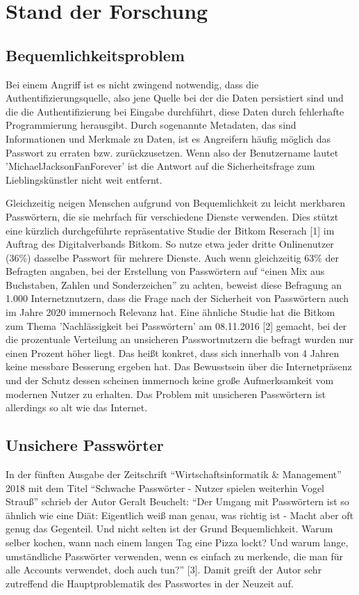 \section{Stand der Forschung}
\subsection{Bequemlichkeitsproblem}
Bei einem Angriff ist es nicht zwingend notwendig, dass die Authentifizierungsquelle, also jene Quelle bei der die Daten persistiert sind und die die Authentifizierung bei Eingabe durchführt, diese Daten durch fehlerhafte Programmierung herausgibt. Durch sogenannte Metadaten, das sind Informationen und Merkmale zu Daten, ist es Angreifern häufig möglich das Passwort zu erraten bzw. zurückzusetzen. Wenn also der Benutzername lautet 'MichaelJacksonFanForever' ist die Antwort auf die Sicherheitsfrage zum Lieblingskünstler nicht weit entfernt.

Gleichzeitig neigen Menschen aufgrund von Bequemlichkeit zu leicht merkbaren Passwörtern, die sie mehrfach für verschiedene Dienste verwenden. Dies stützt eine kürzlich durchgeführte repräsentative Studie der Bitkom Reserach [1] im Auftrag des Digitalverbands Bitkom. So nutze etwa jeder dritte Onlinenutzer (36\%) dasselbe Passwort für mehrere Dienste. Auch wenn gleichzeitig 63\% der Befragten angaben, bei der Erstellung von Passwörtern auf ``einen Mix aus Buchstaben, Zahlen und Sonderzeichen'' zu achten, beweist diese Befragung an 1.000 Internetznutzern, dass die Frage nach der Sicherheit von Passwörtern auch im Jahre 2020 immernoch Relevanz hat. Eine ähnliche Studie hat die Bitkom zum Thema 'Nachlässigkeit bei Passwörtern' am 08.11.2016 [2] gemacht, bei der die prozentuale Verteilung an unsicheren Passwortnutzern die befragt wurden nur einen Prozent höher liegt. Das heißt konkret, dass sich innerhalb von 4 Jahren keine messbare Besserung ergeben hat. Das Bewusstsein über die Internetpräsenz und der Schutz dessen scheinen immernoch keine große Aufmerksamkeit vom modernen Nutzer zu erhalten. Das Problem mit unsicheren Passwörtern ist allerdings so alt wie das Internet.

\subsection{Unsichere Passwörter}
In der fünften Ausgabe der Zeitschrift ``Wirtschaftsinformatik \& Management''  2018 mit dem Titel ``Schwache Passwörter - Nutzer spielen weiterhin Vogel Strauß'' schrieb der Autor Geralt Beuchelt: ``Der Umgang mit Passwörtern ist so ähnlich wie eine Diät: Eigentlich weiß man genau, was richtig ist - Macht aber oft genug das Gegenteil. Und nicht selten ist der Grund Bequemlichkeit. Warum selber kochen, wann nach einem langen Tag eine Pizza lockt? Und warum lange, umständliche Passwörter verwenden, wenn es einfach zu merkende, die man für alle Accounts verwendet, doch auch tun?'' [3]. Damit greift der Autor sehr zutreffend die Hauptproblematik des Passwortes in der Neuzeit auf.

